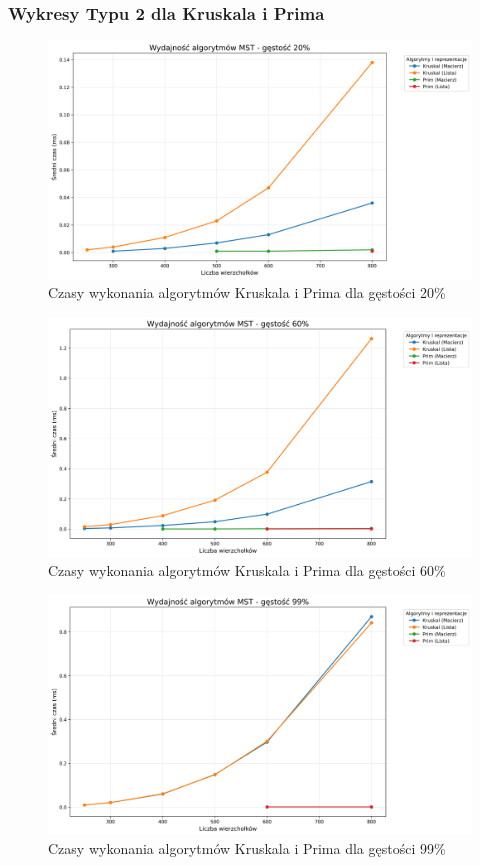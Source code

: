 \documentclass{article}
\begin{document}
\subsubsection{Wykresy Typu 2 dla Kruskala i Prima}

\begin{figure}[H]
    \centering
    \includegraphics[scale=0.4]{../Python/charts_type2/Typ2_MST_gestosc20_wykres.png}
    \caption{Czasy wykonania algorytmów Kruskala i Prima dla gęstości 20\%}
\end{figure}
\begin{figure}[H]
    \centering
    \includegraphics[scale=0.4]{../Python/charts_type2/Typ2_MST_gestosc60_wykres.png}
    \caption{Czasy wykonania algorytmów Kruskala i Prima dla gęstości 60\%}
\end{figure}

\begin{figure}[H]
    \centering
    \includegraphics[scale=0.4]{../Python/charts_type2/Typ2_MST_gestosc99_wykres.png}
    \caption{Czasy wykonania algorytmów Kruskala i Prima dla gęstości 99\%}
\end{figure}
\end{document}
